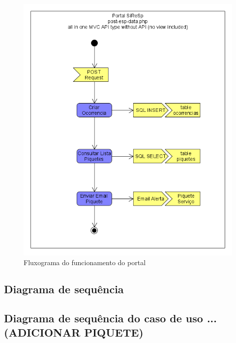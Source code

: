 \begin{figure}[!htb]
	\centering
	\includegraphics[width=\textwidth]{figuras/fluxograma_portal.png}
	\caption{Fluxograma do funcionamento do portal}
	\label{fig:fluxograma_portal}
\end{figure}

\FloatBarrier\subsection{Diagrama de sequência}

\FloatBarrier\subsection{Diagrama de sequência do caso de uso ...(ADICIONAR PIQUETE)}



